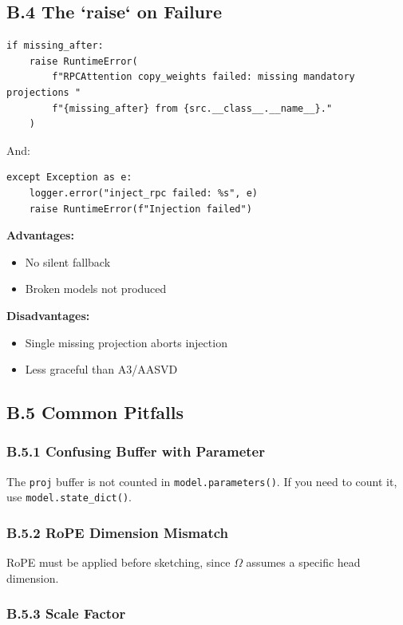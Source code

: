 \subsection{B.4 The `raise` on Failure}

\begin{lstlisting}
if missing_after:
    raise RuntimeError(
        f"RPCAttention copy_weights failed: missing mandatory projections "
        f"{missing_after} from {src.__class__.__name__}."
    )
\end{lstlisting}

And:

\begin{lstlisting}
except Exception as e:
    logger.error("inject_rpc failed: %s", e)
    raise RuntimeError(f"Injection failed")
\end{lstlisting}

\textbf{Advantages:}
\begin{itemize}
\item No silent fallback
\item Broken models not produced

\end{itemize}
\textbf{Disadvantages:}
\begin{itemize}
\item Single missing projection aborts injection
\item Less graceful than A3/AASVD

\end{itemize}
\subsection{B.5 Common Pitfalls}

\subsubsection{B.5.1 Confusing Buffer with Parameter}

The \texttt{proj} buffer is not counted in \texttt{model.parameters()}. If you need 
to count it, use \texttt{model.state\_dict()}.

\subsubsection{B.5.2 RoPE Dimension Mismatch}

RoPE must be applied before sketching, since $\Omega$ assumes a specific 
head dimension.

\subsubsection{B.5.3 Scale Factor}

